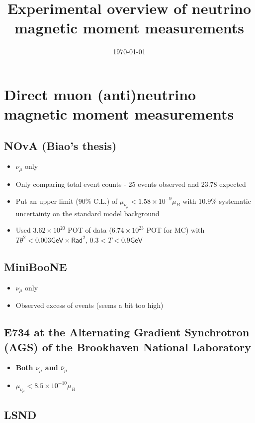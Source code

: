 \documentclass[12pt]{article}
\title{Experimental overview of neutrino magnetic moment measurements}
\date{\today}
\begin{document}
\maketitle

\section{Direct muon (anti)neutrino magnetic moment measurements}
\subsection{NOvA (Biao's thesis)}
\begin{itemize}
    \item $\nu_\mu$ only
    \item Only comparing total event counts - 25 events observed and 23.78 expected
    \item Put an upper limit ($90\%$ C.L.) of $\mu_{\nu_\mu}<1.58\times 10^{-9}\mu_B$ with $10.9\%$ systematic uncertainty on the standard model background
    \item Used $3.62\times 10^{20}$ POT of data ($6.74\times 10^{23}$ POT for MC) with $T\theta^2<0.003\textsf{GeV}\times\textsf{Rad}^2$, $0.3<T<0.9\textsf{GeV}$
\end{itemize}

\subsection{MiniBooNE}
\begin{itemize}
    \item $\nu_\mu$ only
    \item Observed excess of events (seems a bit too high)
\end{itemize}

\subsection{E734 at the Alternating Gradient Synchrotron (AGS) of the Brookhaven National Laboratory}
\begin{itemize}
    \item \textbf{Both $\nu_\mu$ and $\overline{\nu}_\mu$}
    \item $\mu_{\nu_\mu}<8.5\times 10^{-10}\mu_B$
\end{itemize}

\subsection{LSND}
\end{document}
